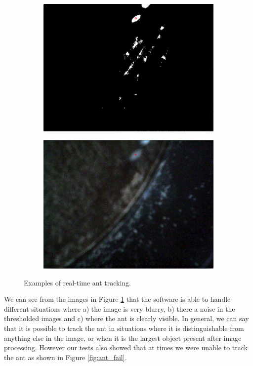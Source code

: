 \begin{figure}
\begin{subfigure}[b]{0.35\textwidth}
                \caption{}
        \end{subfigure}\\ \mbox{}\\
        \begin{subfigure}[b]{0.35\textwidth}
                \includegraphics[scale = 0.3]{img/good4t}
                \caption{}
        \end{subfigure}
		\quad
        \begin{subfigure}[b]{0.35\textwidth}
                \includegraphics[scale = 0.3]{img/good4}
                \caption{}
        \end{subfigure}
		\caption{Examples of real-time ant tracking.}
		\label{fig:ant_tracking}
\end{figure}

We can see from the images in Figure \ref{fig:ant_tracking} that the software is able to handle different situations where a) the image is very blurry, b) there a noise in the thresholded images and c) where the ant is clearly visible. In general, we can say that it is possible to track the ant in situations where it is distinguishable from anything else in the image, or when it is the largest object present after image processing. However our tests also showed that at times we were unable to track the ant as shown in Figure \ref{fig:ant_fail}.\\

